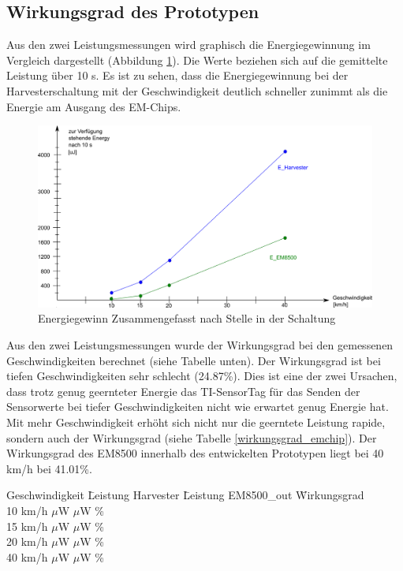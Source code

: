 \subsection{Wirkungsgrad des Prototypen}

Aus den zwei Leistungsmessungen wird graphisch die Energiegewinnung im Vergleich dargestellt (Abbildung \ref{zsmEnergyGewinn}). Die Werte beziehen sich auf die gemittelte Leistung über 10 s. Es ist zu sehen, dass die Energiegewinnung bei der Harvesterschaltung mit der Geschwindigkeit deutlich schneller zunimmt als die Energie am Ausgang des EM-Chips. 

\begin{figure}[ht]
    \includegraphics[width=1\textwidth]{4Resultate/imag/EnergyGewinnNachStelle.png} 
    \caption{Energiegewinn Zusammengefasst nach Stelle in der Schaltung}
    \label{zsmEnergyGewinn}
\end{figure}

Aus den zwei Leistungsmessungen wurde der Wirkungsgrad bei den gemessenen Geschwindigkeiten berechnet (siehe Tabelle unten). Der Wirkungsgrad ist bei tiefen Geschwindigkeiten sehr schlecht (24.87\thinspace\%). Dies ist eine der zwei Ursachen, dass trotz genug geernteter Energie das TI-SensorTag für das Senden der Sensorwerte bei tiefer Geschwindigkeiten nicht wie erwartet genug Energie hat. Mit mehr Geschwindigkeit erhöht sich nicht nur die geerntete Leistung rapide, sondern auch der Wirkungsgrad (siehe Tabelle \ref{wirkungsgrad_emchip}). Der Wirkungsgrad des EM8500 innerhalb des entwickelten Prototypen liegt bei 40 km/h  bei 41.01\thinspace\%.  

\begin{minipage}{\textwidth}
    \begin{tabbing}
    \label{wirkungsgrad_emchip}
        Geschwindigkeit \quad\= Leistung Harvester \quad\= Leistung EM8500\_out \quad\= Wirkungsgrad\\[0.8ex]
        10 km/h    $\mu$W    $\mu$W \thinspace\%  \\
        15 km/h    $\mu$W   $\mu$W \thinspace\%  \\
        20 km/h  $\mu$W   $\mu$W \thinspace\%  \\
        40 km/h  $\mu$W  $\mu$W \thinspace\%  \\
    \end{tabbing}
\end{minipage}  


